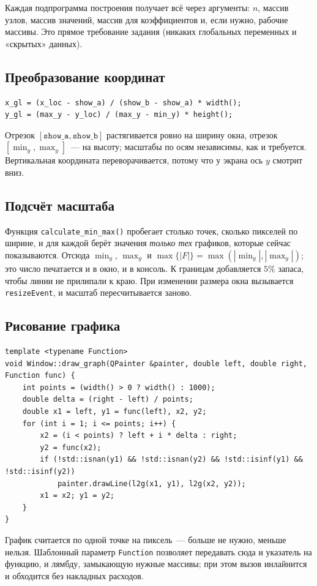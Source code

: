 \documentclass[11pt,a4paper]{report}
\begin{document}
Каждая подпрограмма построения получает всё через аргументы: $n$, массив узлов,
массив значений, массив для коэффициентов и, если нужно, рабочие массивы. Это
прямое требование задания (никаких глобальных переменных и «скрытых» данных).

\subsection{Преобразование координат}

\begin{lstlisting}[style=cpp]
x_gl = (x_loc - show_a) / (show_b - show_a) * width();
y_gl = (max_y - y_loc) / (max_y - min_y) * height();
\end{lstlisting}
Отрезок $[\texttt{show\_a},\texttt{show\_b}]$ растягивается ровно на ширину
окна, отрезок $[\min_y,\max_y]$~--- на высоту; масштабы по осям независимы,
как и требуется. Вертикальная координата переворачивается, потому что у экрана
ось $y$ смотрит вниз.

\subsection{Подсчёт масштаба}

Функция \texttt{calculate\_min\_max()} пробегает столько точек, сколько
пикселей по ширине, и для каждой берёт значения \emph{только тех} графиков,
которые сейчас показываются. Отсюда $\min_y$, $\max_y$ и
$\max\{|F|\}=\max(|\min_y|,|\max_y|)$; это число печатается и в окно, и в
консоль. К границам добавляется $5\%$ запаса, чтобы линии не прилипали к краю.
При изменении размера окна вызывается \texttt{resizeEvent}, и масштаб
пересчитывается заново.

\subsection{Рисование графика}

\begin{lstlisting}[style=cpp]
template <typename Function>
void Window::draw_graph(QPainter &painter, double left, double right, Function func) {
    int points = (width() > 0 ? width() : 1000);
    double delta = (right - left) / points;
    double x1 = left, y1 = func(left), x2, y2;
    for (int i = 1; i <= points; i++) {
        x2 = (i < points) ? left + i * delta : right;
        y2 = func(x2);
        if (!std::isnan(y1) && !std::isnan(y2) && !std::isinf(y1) && !std::isinf(y2))
            painter.drawLine(l2g(x1, y1), l2g(x2, y2));
        x1 = x2; y1 = y2;
    }
}
\end{lstlisting}
График считается по одной точке на пиксель~--- больше не нужно, меньше нельзя.
Шаблонный параметр \texttt{Function} позволяет передавать сюда и указатель на
функцию, и лямбду, замыкающую нужные массивы; при этом вызов
инлайнится и обходится без накладных расходов.
\end{document}
